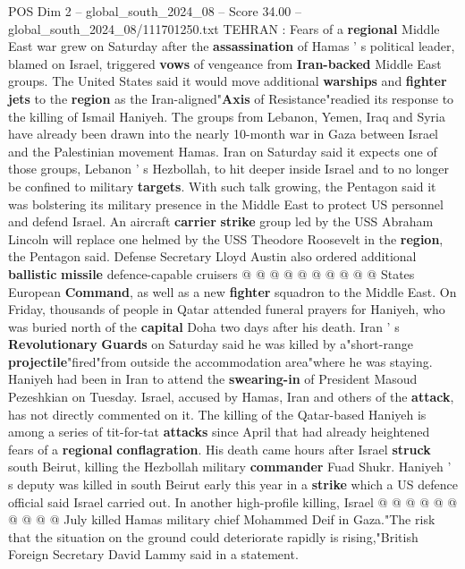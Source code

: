 \begin{textsample}{POS Dim 2 – global\_south\_2024\_08 – Score 34.00 – global\_south\_2024\_08/111701250.txt}  \label{ex:f2_pos_002}
TEHRAN : Fears of a \textbf{regional} Middle East war grew on Saturday after the \textbf{assassination} of Hamas ' s political leader, blamed on Israel, triggered \textbf{vows} of vengeance from \textbf{Iran-backed} Middle East groups.
The United States said it would move additional \textbf{warships} and \textbf{fighter} \textbf{jets} to the \textbf{region} as the Iran-aligned"\textbf{Axis} of Resistance"readied its response to the killing of Ismail Haniyeh.
The groups from Lebanon, Yemen, Iraq and Syria have already been drawn into the nearly 10-month war in Gaza between Israel and the Palestinian movement Hamas.
Iran on Saturday said it expects one of those groups, Lebanon ' s Hezbollah, to hit deeper inside Israel and to no longer be confined to military \textbf{targets}.
With such talk growing, the Pentagon said it was bolstering its military presence in the Middle East to protect US personnel and defend Israel.
An aircraft \textbf{carrier} \textbf{strike} group led by the USS Abraham Lincoln will replace one helmed by the USS Theodore Roosevelt in the \textbf{region}, the Pentagon said.
Defense Secretary Lloyd Austin also ordered additional \textbf{ballistic} \textbf{missile} defence-capable cruisers @ @ @ @ @ @ @ @ @ @ States European \textbf{Command}, as well as a new \textbf{fighter} squadron to the Middle East.
On Friday, thousands of people in Qatar attended funeral prayers for Haniyeh, who was buried north of the \textbf{capital} Doha two days after his death.
Iran ' s \textbf{Revolutionary} \textbf{Guards} on Saturday said he was killed by a"short-range \textbf{projectile}"fired"from outside the accommodation area"where he was staying.
Haniyeh had been in Iran to attend the \textbf{swearing-in} of President Masoud Pezeshkian on Tuesday.
Israel, accused by Hamas, Iran and others of the \textbf{attack}, has not directly commented on it.
The killing of the Qatar-based Haniyeh is among a series of tit-for-tat \textbf{attacks} since April that had already heightened fears of a \textbf{regional} \textbf{conflagration}.
His death came hours after Israel \textbf{struck} south Beirut, killing the Hezbollah military \textbf{commander} Fuad Shukr.
Haniyeh ' s deputy was killed in south Beirut early this year in a \textbf{strike} which a US defence official said Israel carried out.
In another high-profile killing, Israel @ @ @ @ @ @ @ @ @ @ July killed Hamas military chief Mohammed Deif in Gaza."The risk that the situation on the ground could deteriorate rapidly is rising,"British Foreign Secretary David Lammy said in a statement.

\end{textsample}
